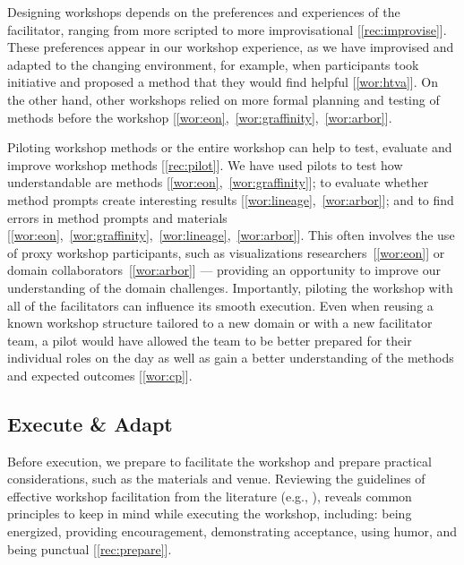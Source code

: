 Designing workshops depends on the preferences and experiences of the facilitator, ranging from more scripted to more improvisational [\ref{rec:improvise}]. These preferences appear in our workshop experience, as we have improvised and adapted to the changing environment, for example, when participants took initiative and proposed a method that they would find helpful [\ref{wor:htva}]. On the other hand, other workshops relied on more formal planning and testing of methods before the workshop [\ref{wor:eon},~\ref{wor:graffinity},~\ref{wor:arbor}]. 

Piloting workshop methods or the entire workshop can help to test, evaluate and improve workshop methods [\ref{rec:pilot}]. We have used pilots to test how understandable are methods [\ref{wor:eon},~\ref{wor:graffinity}]; to evaluate whether method prompts create interesting results [\ref{wor:lineage},~\ref{wor:arbor}]; and to find errors in method prompts and materials [\ref{wor:eon},~\ref{wor:graffinity},~\ref{wor:lineage},~\ref{wor:arbor}]. This often involves the use of proxy workshop participants, such as visualizations researchers~[\ref{wor:eon}] or domain collaborators~[\ref{wor:arbor}] --- providing an opportunity to improve our understanding of the domain challenges.  Importantly, piloting the workshop with all of the facilitators can influence its smooth execution. Even when reusing a known workshop structure tailored to a new domain or with a new facilitator team, a pilot would have allowed the team to be better prepared for their individual roles on the day as well as gain a better understanding of the methods and expected outcomes [\ref{wor:cp}].

\subsection{Execute \& Adapt}

Before execution, we prepare to facilitate the workshop and prepare practical considerations, such as the materials and venue. Reviewing the guidelines of effective workshop facilitation from the literature (e.g., \cite{Brooks-Harris1999,CreativeEducationFoundation2015,Hamilton2016,Macanufo2010,Stanfield2002}), reveals common principles to keep in mind while executing the workshop, including: being energized, providing encouragement, demonstrating acceptance, using humor, and being punctual [\ref{rec:prepare}]. 

